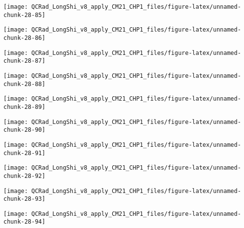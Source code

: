 \documentclass[
  10pt,
  a4paper,oneside]{article}
\begin{document}
\begin{center}\texttt{[image: QCRad\_LongShi\_v8\_apply\_CM21\_CHP1\_files/figure-latex/unnamed-chunk-28-85]} \end{center}

\begin{center}\texttt{[image: QCRad\_LongShi\_v8\_apply\_CM21\_CHP1\_files/figure-latex/unnamed-chunk-28-86]} \end{center}

\begin{center}\texttt{[image: QCRad\_LongShi\_v8\_apply\_CM21\_CHP1\_files/figure-latex/unnamed-chunk-28-87]} \end{center}

\begin{center}\texttt{[image: QCRad\_LongShi\_v8\_apply\_CM21\_CHP1\_files/figure-latex/unnamed-chunk-28-88]} \end{center}

\begin{center}\texttt{[image: QCRad\_LongShi\_v8\_apply\_CM21\_CHP1\_files/figure-latex/unnamed-chunk-28-89]} \end{center}

\begin{center}\texttt{[image: QCRad\_LongShi\_v8\_apply\_CM21\_CHP1\_files/figure-latex/unnamed-chunk-28-90]} \end{center}

\begin{center}\texttt{[image: QCRad\_LongShi\_v8\_apply\_CM21\_CHP1\_files/figure-latex/unnamed-chunk-28-91]} \end{center}

\begin{center}\texttt{[image: QCRad\_LongShi\_v8\_apply\_CM21\_CHP1\_files/figure-latex/unnamed-chunk-28-92]} \end{center}

\begin{center}\texttt{[image: QCRad\_LongShi\_v8\_apply\_CM21\_CHP1\_files/figure-latex/unnamed-chunk-28-93]} \end{center}

\begin{center}\texttt{[image: QCRad\_LongShi\_v8\_apply\_CM21\_CHP1\_files/figure-latex/unnamed-chunk-28-94]} \end{center}
\end{document}
